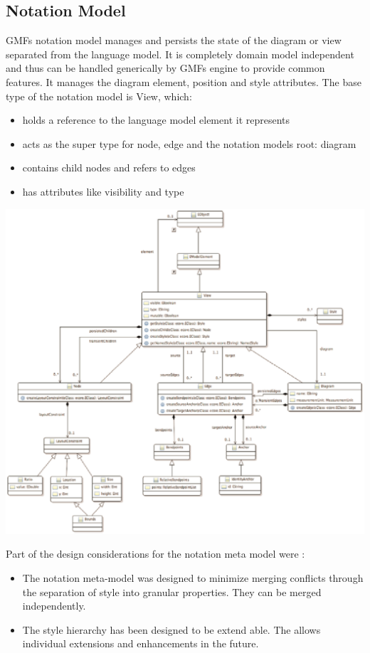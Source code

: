 \subsection{Notation Model}
GMFs notation model manages and persists the state of the diagram or view separated from the language model. It is completely domain model independent and thus can be handled generically by GMFs engine to provide common features. It manages the diagram element, position and style attributes. \cite{EMP} The base type of the notation model is View, which:
\begin{itemize}
	\item holds a reference to the language model element it represents 
	\item acts as the super type for node, edge and the notation models root: diagram
	\item contains child nodes and refers to edges
	\item has attributes like visibility and type
\end{itemize}

\begin{center}
\includegraphics[scale=0.5]{gfx/NotationMM.png}
\end{center}

Part of the design considerations for the notation meta model were \cite{GMFDoc}:
\begin{itemize}
	\item The notation meta-model was designed to minimize merging conflicts through the separation of style into granular properties. They can be merged independently.
	\item The style hierarchy has been designed to be extend able. The allows individual extensions and enhancements in the future. 
\end{itemize}


